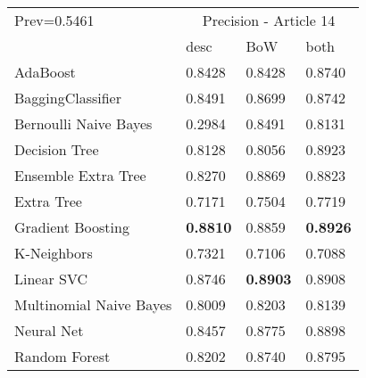\begin{tabular}{|l|l|l|l| }
\hline
Prev=0.5461 &  \multicolumn{3}{c|}{Precision - Article 14} \\
\cline{2-4} & desc & BoW & both \\ \hline
AdaBoost                & 0.8428 & 0.8428 & 0.8740\\
BaggingClassifier       & 0.8491 & 0.8699 & 0.8742\\
Bernoulli Naive Bayes   & 0.2984 & 0.8491 & 0.8131\\
Decision Tree           & 0.8128 & 0.8056 & 0.8923\\
Ensemble Extra Tree     & 0.8270 & 0.8869 & 0.8823\\
Extra Tree              & 0.7171 & 0.7504 & 0.7719\\
Gradient Boosting       & {\bf 0.8810} & 0.8859 & {\bf 0.8926}\\
K-Neighbors             & 0.7321 & 0.7106 & 0.7088\\
Linear SVC              & 0.8746 & {\bf 0.8903} & 0.8908\\
Multinomial Naive Bayes & 0.8009 & 0.8203 & 0.8139\\
Neural Net              & 0.8457 & 0.8775 & 0.8898\\
Random Forest           & 0.8202 & 0.8740 & 0.8795\\
\hline
\end{tabular}